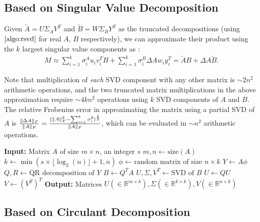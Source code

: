 \documentclass[onefignum,onetabnum]{siamart171218}
\DeclarePairedDelimiter\norm{\lVert}{\rVert}
\begin{document}
\subsection{Based on Singular Value Decomposition}
Given $\tilde{A} = U \Sigma_A V^T$ and $\tilde{B} = W \Sigma_B Y^T$ as the truncated decompositions (using $\cref{algo:rsvd}$ for real $A$, $B$ respectively), we can approximate their product using the $k$ largest singular value components as :
\begin{align*}
    M \approx \sum\limits_{i=1}^{k} \sigma_i^A u_i v_i^T B +\sum_{i=1}^{k} \sigma_{i}^B \Delta Aw_{i}y_{i}^{T} = \tilde{A}B + \Delta A \tilde{B}.
\end{align*}

Note that multiplication of \emph{each} SVD component with any other matrix is $\sim 2n^2$ arithmetic operations, and the two truncated matrix multiplications in the above approximation require $\sim 4kn^2$ operations using $k$ SVD components of $A$ and $B$. The relative Frobenius error in approximating the matrix using a partial SVD of $A$ is $\frac{\norm{\Delta A}_F}{\norm{A}_F}=\frac{(\norm{A}_F^2-\sum_{i=1}^{k} \sigma_i^2)^{\frac{1}{2}}}{\norm{A}_F}$, which can be evaluated in $\sim n^2$ arithmetic operations.
 
\begin{algorithm}
\caption{Randomized partial SVD \cite{halko2010findingstructurerandomnessprobabilistic}}\label{algo:rsvd}
\begin{algorithmic}[1]
\State \textbf{Input:} Matrix \( A \) of size \( m \times n \), an integer \( s \)
\State \( m, n \gets \text{size}(A) \)
\State \( k \gets \min(s \times \lfloor \log_2(n) \rfloor + 1, n) \)
\State \( \phi \gets \text{random matrix of size } n \times k \)
\State \( Y \gets A \phi \)
\State \( Q, R \gets \text{QR decomposition of } Y \)
\State \( B \gets Q^TA \)
\State \( U, \Sigma, V^T \gets \text{SVD of } B \)
\State \( U \gets Q U \)
\State \(V \gets (V^{T})^{T} \)
\State \textbf{Output:} Matrices \( U ( \in \mathbb{R}^{m\times k}), \Sigma (\in \mathbb{R}^{k\times k}), V(\in \mathbb{R}^{n\times k}) \)
\end{algorithmic}
\end{algorithm}

\subsection{Based on Circulant Decomposition}
\end{document}
